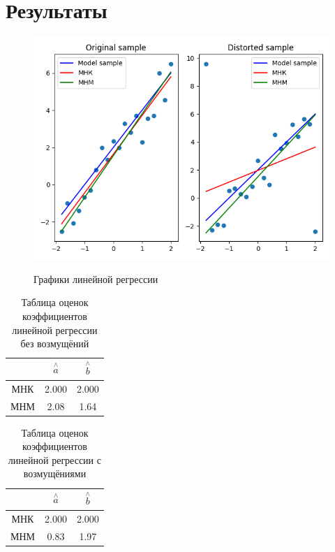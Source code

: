 \documentclass[12pt]{article}
\begin{document}
\section{Результаты}


\begin{figure}[H]
    \centering
    \caption{Графики линейной регрессии}
    \includegraphics[scale = 0.6]{plt.png} 
    \label{fig:reg}
\end{figure}

\begin{table}[H]
\caption{Таблица оценок коэффициентов линейной регрессии без возмущёний}
\label{tab:my_label1}
\begin{center}
\vspace{5mm}
\begin{tabular}{|c|c|c|}
\hline
& $\overset{\wedge}{a}$ & $\overset{\wedge}{b}$\\
\hline
МНК &2.000&2.000\\
\hline
МНМ &2.08&1.64\\
\hline
\end{tabular}
\end{center}
\end{table}


\begin{table}[H]
\caption{Таблица оценок коэффициентов линейной регрессии с возмущёниями}
\label{tab:my_label2}
\begin{center}
\vspace{5mm}
\begin{tabular}{|c|c|c|}
\hline
& $\overset{\wedge}{a}$ & $\overset{\wedge}{b}$\\
\hline
МНК &2.000&2.000\\
\hline
МНМ &0.83 &1.97\\
\hline
\end{tabular}
\end{center}
\end{table}
\end{document}
